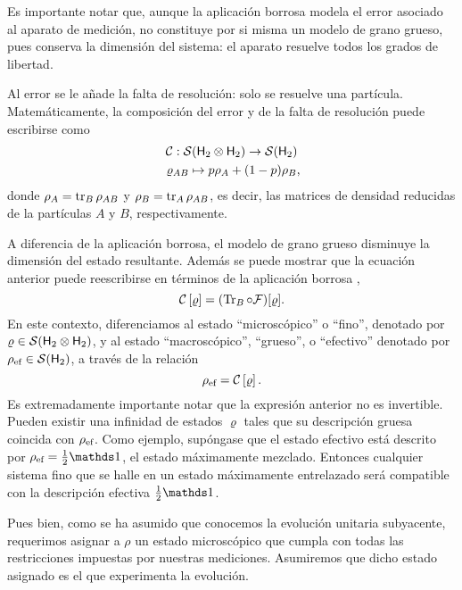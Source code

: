 Es importante notar que, aunque la aplicación borrosa modela el error asociado al aparato de medición, no constituye por si misma un modelo de grano grueso, pues conserva la dimensión del sistema: el aparato resuelve todos los grados de libertad.


Al error se le añade la falta de resolución: solo se resuelve una partícula. Matemáticamente, la composición del error y de la falta de resolución puede escribirse como
\begin{gather}
    \mcC:\mcS(\hilbert_2 \otimes \hilbert_2)\to \mcS(\hilbert_2)\nonumber\\
    \varrho_{AB} \mapsto p\rho_A+(1-p)\rho_B\rlap{,}\nonumber
\end{gather}
donde $\rho_A=\tr_B \rho_{AB}$ y $\rho_B=\tr_A \rho_{AB}$, es decir, las matrices de densidad reducidas de la partículas $A$ y $B$, respectivamente.


A diferencia de la aplicación borrosa, el modelo de grano grueso disminuye la dimensión del estado resultante. Además se puede mostrar que la ecuación anterior puede reescribirse en términos de la aplicación borrosa \cite{FuzzyMeasurements},
\begin{equation}
\mathcal{C}\left[\varrho\right]=(\Tr_{B}\circ\mathcal{F})[\varrho].\nonumber
\end{equation}
En este contexto, diferenciamos al estado ``microscópico'' o ``fino'', denotado por $\varrho\in \mathcal{S}({\sf H}_2\otimes{\sf H}_2)$, y al estado ``macroscópico'', ``grueso'', o  ``efectivo'' denotado por $\rho_{\text{ef}}\in \mathcal{S}({\sf H}_2)$, a través de la relación
\begin{equation}
    \rho_{\text{ef}}=\mathcal{C}\left[\varrho\right].\nonumber
\end{equation}
Es extremadamente importante notar que la expresión anterior no es invertible. Pueden existir una infinidad de estados $\varrho$ tales que su descripción gruesa coincida con $\rho_{\text{ef}}$. Como ejemplo, supóngase que el estado efectivo está descrito por $\rho_{\ef}=\frac{1}{2}\Id$, el estado máximamente mezclado. Entonces cualquier sistema fino que se halle en un estado máximamente entrelazado será compatible con la descripción efectiva $\frac{1}{2}\Id$.

Pues bien, como se ha asumido que conocemos la evolución unitaria subyacente, requerimos asignar a $\rho$ un estado microscópico que cumpla con todas las restricciones impuestas por nuestras mediciones. Asumiremos que dicho estado asignado es el que experimenta la evolución. 

